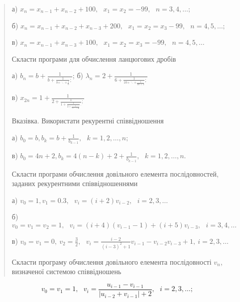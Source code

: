 \documentclass[]{article}
\begin{document}
\begin{quote}
\protect\hypertarget{_Hlk65241703}{}{}а)
\(x_{n} = x_{n - 1} + x_{n - 2} + 100,\mathrm{\text{\ \ \ \ \ }}x_{1} = x_{2} = - 99,\mathrm{\text{\ \ \ }}n = 3,4,\ldots;\)

б)
\(x_{n} = x_{n - 1} + x_{n - 2} + x_{n - 3} + 200,\mathrm{\text{\ \ \ \ \ }}x_{1} = x_{2} = x_{3} - 99,\mathrm{\text{\ \ \ }}n = 4,5,\ldots;\)

в)
\(x_{n} = x_{n - 1} + x_{n - 3} + 100,\mathrm{\text{\ \ \ \ \ }}x_{1} = x_{2} = x_{3} = - 99,\mathrm{\text{\ \ \ }}n = 4,5,\ldots\)

Скласти програми для обчислення ланцюгових дробів

а) \(b_{n} = b + \frac{1}{b + \frac{1}{b + \ddots + \frac{1}{b}};}\); б)
\(\lambda_{n} = 2 + \frac{1}{6 + \frac{1}{10 + \ddots + \frac{1}{4n + 2}};}\)

в)
\(x_{2n} = 1 + \frac{1}{2 + \frac{1}{1 + \frac{1}{2 + \frac{1}{1 + \ddots + \frac{1}{2}}}.};}\)

Вказівка. Використати рекурентні співвідношення

\protect\hypertarget{_Hlk65241742}{}{}а)
\(b_{0} = b,b_{k} = b + \frac{1}{b_{k - 1}},\mathrm{\text{\ \ }}k = 1,2,\ldots,n;\)

в)
\(b_{0} = 4n + 2,b_{k} = 4(n - k) + 2 + \frac{1}{b_{k - 1}},\mathrm{\text{\ \ }}k = 1,2,\ldots,n.\)

\protect\hypertarget{_Hlk65241848}{}{}Скласти програми обчислення
довільного елемента послідовностей, заданих рекурентними
співвідношеннями

а)
\(v_{0} = 1,v_{1} = 0.3,\mathrm{\text{\ \ \ \ \ \ \ \ }}v_{i} = (i + 2)v_{i - 2},\mathrm{\text{\ \ \ }}i = 2,3,\ldots\)

б)
\(v_{0} = v_{1} = v_{2} = 1,\mathrm{\text{\ \ \ \ \ \ \ \ }}v_{i} = (i + 4)(v_{i - 1} - 1) + (i + 5)v_{i - 3},\mathrm{\text{\ \ }}i = 3,4,\ldots\)

в)
\(v_{0} = v_{1} = 0,\ v_{2} = \frac{3}{2}\mathrm{,\ \ \ }v_{i} = \frac{i - 2}{(i - 3)^{2} + 1}v_{i - 1} - v_{i - 2}v_{i - 3} + 1,\ i = 2,3,\ldots\)

Скласти програму обчислення довільного елемента послідовності \(v_{n}\),
визначеної системою співвідношень
\end{quote}

\[v_{0} = v_{1} = 1,\mathrm{\text{\ \ \ \ }}v_{i} = \frac{u_{i - 1} - v_{i - 1}}{\left| u_{i - 2} + v_{i - 1} \right| + 2},\mathrm{\text{\ \ \ }}i = 2,3,\ldots;\]
\end{document}
